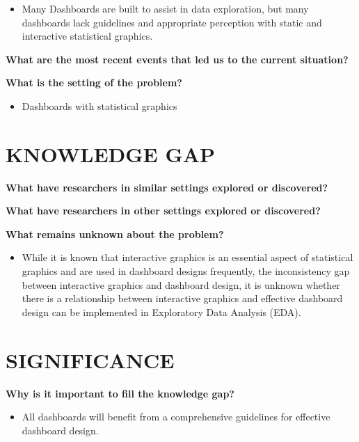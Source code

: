 \documentclass[print]{nuthesis}
\providecommand{\tightlist}{%
  \setlength{\itemsep}{0pt}\setlength{\parskip}{0pt}}
\begin{document}
\begin{itemize}
\tightlist
\item
  Many Dashboards are built to assist in data exploration, but many dashboards lack guidelines and appropriate perception with static and interactive statistical graphics.
\end{itemize}

\textbf{What are the most recent events that led us to the current situation?}

\textbf{What is the setting of the problem?}

\begin{itemize}
\tightlist
\item
  Dashboards with statistical graphics
\end{itemize}

\hypertarget{knowledge-gap}{%
\chapter{KNOWLEDGE GAP}\label{knowledge-gap}}

\textbf{What have researchers in similar settings explored or discovered?}

\textbf{What have researchers in other settings explored or discovered?}

\textbf{What remains unknown about the problem?}

\begin{itemize}
\tightlist
\item
  While it is known that interactive graphics is an essential aspect of statistical graphics and are used in dashboard designs frequently, the inconsistency gap between interactive graphics and dashboard design, it is unknown whether there is a relationship between interactive graphics and effective dashboard design can be implemented in Exploratory Data Analysis (EDA).
\end{itemize}

\hypertarget{significance}{%
\chapter{SIGNIFICANCE}\label{significance}}

\textbf{Why is it important to fill the knowledge gap?}

\begin{itemize}
\tightlist
\item
  All dashboards will benefit from a comprehensive guidelines for effective dashboard design.
\end{itemize}
\end{document}
